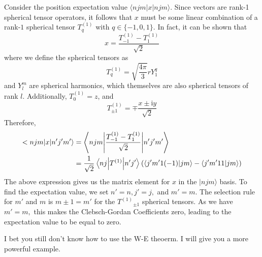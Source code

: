 \documentclass{article}
\begin{document}
	
	Consider the position expectation value $\langle njm|x|njm\rangle  $. Since vectors are rank-1 spherical tensor operators, it follows that $x$ must be some linear combination of a rank-$1$ spherical tensor $T_{q}^{(1)}$ with $q\in \{-1,0,1\}$. In fact, it can be shown that
	\begin{equation*}
		x=\frac{T_{-1}^{(1)} -T_{1}^{(1)}}{\sqrt{2}}
	\end{equation*}
	where we define the spherical tensors as
	\begin{equation*}
		T_{q}^{(1)} =\sqrt{\frac{4\pi }{3}} rY_{1}^{q}
	\end{equation*}
	and $Y_{l}^{m}$ are spherical harmonics, which themselves are also spherical tensors of rank $l$. Additionally, $T_{0}^{(1)} =z$, and
	\begin{equation*}
		T_{\pm 1}^{(1)} =\mp \frac{x\pm \mathrm{i} y}{\sqrt{2}}
	\end{equation*}
	Therefore,
	\begin{equation*}
		\begin{aligned}
			< njm|x|n'j'm'\rangle   & =\mel**{njm}{\frac{T_{-1}^{(1)} -T_{1}^{(1)}}{\sqrt{2}}}{n'j'm'}\\
			& =\frac{1}{\sqrt{2}}\mel**{nj}{T^{( 1)}}{n'j'}\left(\bra{j'm'1( -1)}\ket{jm} -\bra{j'm'11}\ket{jm}\right)
		\end{aligned}
	\end{equation*}
	The above expression gives us the matrix element for $x$ in the $|njm\rangle  $ basis. To find the expectation value, we set $n'=n,j'=j,$ and $m'=m.$ The selection rule for $m'$ and $m$ is $m\pm 1=m'$ for the $T^{(1)}{}_{\pm 1}$ spherical tensors. As we have $m'=m,$ this makes the Clebsch-Gordan Coefficients zero, leading to the expectation value to be equal to zero.
	
	
	
	I bet you still don't know how to use the W-E theoerm. I will give you a more powerful example. 
	
\end{document}
